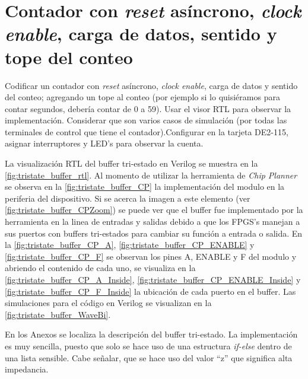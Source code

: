 \section{Contador con \textit{reset} asíncrono, \textit{clock enable}, carga de datos, sentido y tope del conteo \label{sec:s4}}

\begin{center}
	\begin{minipage}{12cm}
		\begin{tcolorbox}[title=Actividad 4]
			Codificar un contador con \textit{reset} asíncrono, \textit{clock enable}, carga de datos y sentido del conteo; agregando un tope al conteo (por ejemplo si lo quisiéramos para contar segundos, debería contar de 0 a 59). Usar el visor RTL para observar la implementación. Considerar que son varios casos de simulación (por todas las terminales de control que tiene el contador).Configurar en la tarjeta DE2-115, asignar interruptores y LED's para observar la cuenta.
		\end{tcolorbox}	
	\end{minipage}
\end{center}

La visualización RTL del buffer tri-estado en Verilog se muestra en la \autoref{fig:tristate_buffer_rtl}. Al momento de utilizar la herramienta de \textit{Chip Planner} se observa en la \autoref{fig:tristate_buffer_CP} la implementación del modulo en la periferia del dispositivo. Si se acerca la imagen a este elemento (ver \autoref{fig:tristate_buffer_CPZoom}) se puede ver que el buffer fue implementado por la herramienta en la linea de entradas y salidas debido a que los FPGS's manejan a sus puertos con buffers tri-estados para cambiar su función a entrada o salida. En la \autoref{fig:tristate_buffer_CP_A}, \autoref{fig:tristate_buffer_CP_ENABLE} y \autoref{fig:tristate_buffer_CP_F} se observan los pines A, ENABLE y F del modulo y abriendo el contenido de cada uno, se visualiza en la \autoref{fig:tristate_buffer_CP_A_Inside}, \autoref{fig:tristate_buffer_CP_ENABLE_Inside} y \autoref{fig:tristate_buffer_CP_F_Inside} la ubicación de cada puerto en el buffer. Las simulaciones para el código en Verilog se visualizan en la \autoref{fig:tristate_buffer_WaveBi}.

En los Anexos se localiza la descripción del buffer tri-estado. La implementación es muy sencilla, puesto que solo se hace uso de una estructura \textit{if-else} dentro de una lista sensible. Cabe señalar, que se hace uso del valor ``z'' que significa alta impedancia.

